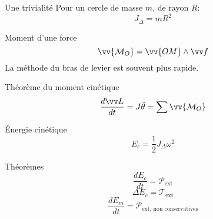 \documentclass[french, a4paper, 11pt, twocolumn]{article}
\begin{document}
\begin{cadre}{Une trivialité}
  Pour un cercle de masse $m$, de rayon $R$:
  \[J_{\Delta} = mR^{2}\]
\end{cadre}

\begin{cadre}{Moment d'une force}
  \[\vv{\mathcal M_{O}} = \vv{OM}\wedge \vv f\]
  La méthode du bras de levier est souvent plus rapide.
\end{cadre}

\begin{cadre}{Théorème du moment cinétique}
  \[\dfrac{d\vv L}{dt}=J\ddot\theta=\sum\vv{\mathcal M_{O}}\]
\end{cadre}

\begin{cadre}{Énergie cinétique}
  \[E_{c} = \dfrac{1}{2}J_{\Delta}\omega^{2}\]
\end{cadre}

\begin{cadre}{Théorèmes}
  \[\dfrac{dE_{c}}{dt}=\mathcal P_{\mathrm{ext}}\]
  \[\Delta E_{c}=\mathcal T_{\mathrm{ext}}\]
  \[\dfrac{dE_{m}}{dt}=\mathcal P_{\text{ext, non conservatives}}\]
\end{cadre}
\end{document}
